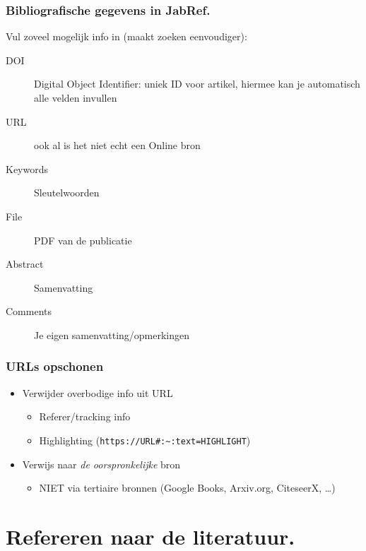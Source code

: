 \documentclass[aspectratio=169]{beamer}
\begin{document}
\begin{frame}
  \frametitle{Bibliografische gegevens in JabRef.}

  Vul zoveel mogelijk info in (maakt zoeken eenvoudiger):

  \begin{description}
    \item[DOI] Digital Object Identifier: uniek ID voor artikel, hiermee kan je automatisch alle velden invullen
    \item[URL] ook al is het niet echt een Online bron
    \item[Keywords] Sleutelwoorden
    \item[File] PDF van de publicatie
    \item[Abstract] Samenvatting
    \item[Comments] Je eigen samenvatting/opmerkingen
  \end{description}

\end{frame}

\begin{frame}[fragile]
  \frametitle{URLs opschonen}

  \begin{itemize}
    \item Verwijder overbodige info uit URL
      \begin{itemize}
        \item Referer/tracking info
        \item Highlighting (\verb+https://URL#:~:text=HIGHLIGHT+)
      \end{itemize}
    \item Verwijs naar \textit{de oorspronkelijke} bron
      \begin{itemize}
        \item NIET via tertiaire bronnen (Google Books, Arxiv.org, CiteseerX, \ldots)
      \end{itemize}
  \end{itemize}

\end{frame}

\section{Refereren naar de literatuur.}
\end{document}
